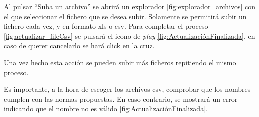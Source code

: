 
Al pulsar ``Suba un archivo'' se abrirá un explorador \ref{fig:explorador_archivos} con el que seleccionar el fichero que se desea subir. Solamente se permitirá subir un fichero cada vez, y en formato xls o csv. Para completar el proceso \ref{fig:actualizar_fileCsv} se pulsará el icono de \emph{play} \ref{fig:ActualizaciónFinalizada}, en caso de querer cancelarlo se hará click en la cruz.


Una vez hecho esta acción se pueden subir más ficheros repitiendo el mismo proceso. 

Es importante, a la hora de escoger los archivos csv, comprobar que los nombres cumplen con las normas propuestas. En caso contrario, se mostrará un error indicando que el nombre no es válido \ref{fig:ActualizaciónFinalizada}. 

